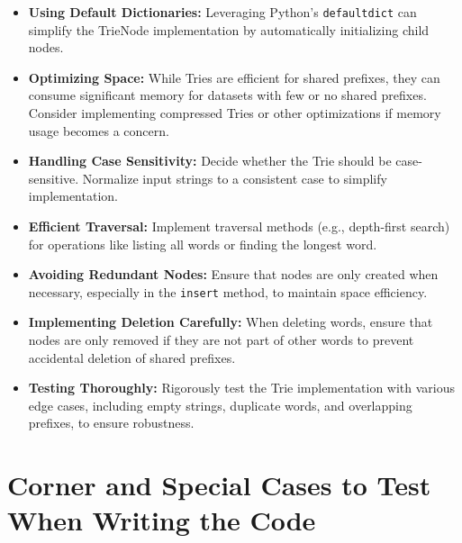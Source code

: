 \begin{itemize}
    \item \textbf{Using Default Dictionaries:} Leveraging Python's \texttt{defaultdict} can simplify the TrieNode implementation by automatically initializing child nodes.
    
    \item \textbf{Optimizing Space:} While Tries are efficient for shared prefixes, they can consume significant memory for datasets with few or no shared prefixes. Consider implementing compressed Tries or other optimizations if memory usage becomes a concern.
    
    \item \textbf{Handling Case Sensitivity:} Decide whether the Trie should be case-sensitive. Normalize input strings to a consistent case to simplify implementation.
    
    \item \textbf{Efficient Traversal:} Implement traversal methods (e.g., depth-first search) for operations like listing all words or finding the longest word.
    
    \item \textbf{Avoiding Redundant Nodes:} Ensure that nodes are only created when necessary, especially in the \texttt{insert} method, to maintain space efficiency.
    
    \item \textbf{Implementing Deletion Carefully:} When deleting words, ensure that nodes are only removed if they are not part of other words to prevent accidental deletion of shared prefixes.
    
    \item \textbf{Testing Thoroughly:} Rigorously test the Trie implementation with various edge cases, including empty strings, duplicate words, and overlapping prefixes, to ensure robustness.
\end{itemize}

\section*{Corner and Special Cases to Test When Writing the Code}

